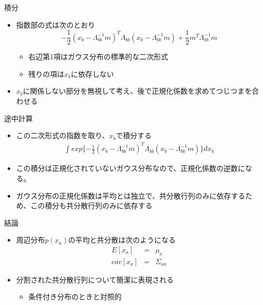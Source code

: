 \begin{frame}{積分}
 \begin{itemize}
  \item 指数部の式は次のとおり
        \begin{equation}
         -\frac{1}{2}(x_b-\Lambda_{bb}^{-1}m)^T\Lambda_{bb}(x_b-\Lambda_{bb}^{-1}m) + \frac{1}{2}m^T\Lambda_{bb}^{-1}m
        \end{equation}
        \begin{itemize}
         \item 右辺第1項はガウス分布の標準的な二次形式
         \item 残りの項は$x_b$に依存しない
        \end{itemize}
  \item $x_b$に関係しない部分を無視して考え、後で正規化係数を求めてつじつまを合わせる
 \end{itemize}
\end{frame}


\begin{frame}{途中計算}
 \begin{itemize}
  \item この二次形式の指数を取り、$x_b$で積分する
        \begin{eqnarray}
         \int exp\{-\frac{1}{2}(x_b-\Lambda_{bb}^{-1}m)^T\Lambda_{bb}(x_b-\Lambda_{bb}^{-1}m)\}dx_b
        \end{eqnarray}
  \item この積分は正規化されていないガウス分布なので、正規化係数の逆数になる。
  \item ガウス分布の正規化係数は平均とは独立で、共分散行列のみに依存するため、この積分も共分散行列のみに依存する
 \end{itemize}
\end{frame}

\begin{frame}{結論}
 \begin{itemize}
  \item 周辺分布$p(x_a)$の平均と共分散は次のようになる
        \begin{eqnarray}
         E[x_a] &=&  \mu_a\\
         cov[x_a]&=&\Sigma_{aa}
        \end{eqnarray}
  \item 分割された共分散行列について簡潔に表現される
        \begin{itemize}
         \item 条件付き分布のときと対照的
        \end{itemize}
 \end{itemize}
\end{frame}
